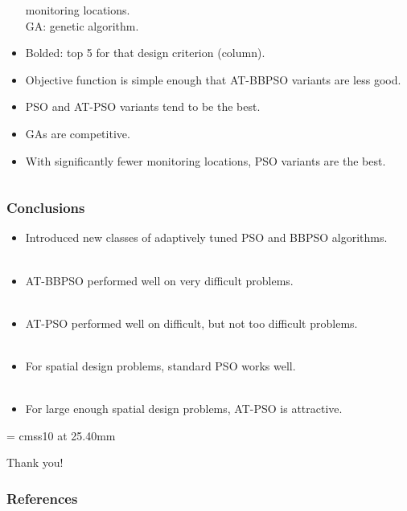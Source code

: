 \documentclass[xcolor=dvipsnames]{beamer}
\begin{document}
\begin{frame}
\begin{columns}
\begin{column}{0.55\textwidth}
\begin{itemize}
\hspace{1.42cm} monitoring locations.\\
GA: genetic algorithm.
\item Bolded: top 5 for that design criterion (column).\pause
\item Objective function is simple enough that AT-BBPSO variants are less good.\pause
\item PSO and AT-PSO variants tend to be the best. \pause
\item GAs are competitive. \pause
\item With significantly fewer monitoring locations, PSO variants are the best.
  \end{itemize}
\end{column}
\end{columns}
\end{frame}

\begin{frame}
  \frametitle{Conclusions}
  \begin{itemize}
  \item Introduced new classes of adaptively tuned PSO and BBPSO algorithms.\\~\\ \pause
  \item AT-BBPSO performed well on very difficult problems. \\~\\ \pause
  \item AT-PSO performed well on difficult, but not too difficult problems. \\~\\ \pause
  \item For spatial design problems, standard PSO works well. \\~\\\pause
  \item For large enough spatial design problems, AT-PSO is attractive.
  \end{itemize}
\end{frame}

\appendix
{}
\setcounter{finalframe}{\value{framenumber}}

\begin{frame}

      \begin{center}

        \font\endfont = cmss10 at 25.40mm
        \color{MUgold}
        \endfont 
        \baselineskip 20.0mm

        Thank you!

      \end{center}    


\end{frame}

\begin{frame}[allowframebreaks]
        \frametitle{References}
        
        
\end{frame} 
\setcounter{framenumber}{\value{finalframe}}
\end{document}
